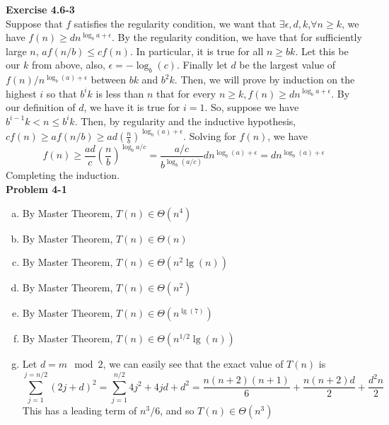 \documentclass{article}
\begin{document}
\noindent\textbf{Exercise 4.6-3}\\

Suppose that $f$ satisfies the regularity condition, we want that $\exists \epsilon, d,k$,$\forall n\ge k$, we have $f(n) \ge d n^{\log_b a +\epsilon}$. By the regularity condition, we have that for sufficiently large $n$, $af(n/b) \le cf(n)$. In particular, it is true for all $n\ge bk$. Let this be our $k$ from above, also, $\epsilon= -\log_b(c)$. Finally let $d$ be the largest value of $f(n)/n^{\log_b(a)+\epsilon}$ between $bk$ and $b^2k$. Then, we will prove by induction on the highest $i$ so that $b^i k$ is less than $n$ that for every $n\ge k, f(n) \ge d n^{\log_b a +\epsilon}$. By our definition of $d$, we have it is true for $i= 1$. So, suppose we have $b^{i-1}k < n \le b^i k$. Then, by regularity and the inductive hypothesis,  $cf(n) \ge a f(n/b) \ge ad \left(\frac{n}{b}\right)^{\log_b(a) +\epsilon}$. Solving for $f(n)$, we have
\[
f(n) \ge \frac{ad}{c} \left(\frac{n}{b}\right)^{\log_b{a/c}} = \frac{a/c}{b^{\log_b(a/c)}} d n^{\log_b(a) + \epsilon} =  d n^{\log_b(a) + \epsilon}
\]
Completing the induction. \\



\noindent\textbf{Problem 4-1}\\

\begin{enumerate}[a.]
\item
By Master Theorem, $T(n) \in \Theta(n^4)$

\item
By Master Theorem, $T(n) \in \Theta(n)$

\item
By Master Theorem, $T(n) \in \Theta(n^2\lg(n))$

\item
By Master Theorem, $T(n) \in \Theta(n^2)$

\item
By Master Theorem, $T(n) \in \Theta(n^{\lg(7)})$

\item
By Master Theorem, $T(n) \in \Theta(n^{1/2}\lg(n))$

\item
Let $d = m\mod 2$, we can easily see that the exact value of $T(n)$ is
\[
\sum_{j=1}^{j=n/2} (2j+d)^2 = \sum_{j=1}^{n/2}4j^2 + 4jd + d^2 = \frac{n(n+2)(n+1)}{6} + \frac{n(n+2)d}{2} + \frac{d^2n}{2}
\]
This has a leading term of $n^3/6$, and so $T(n) \in \Theta(n^3)$

\end{enumerate}
\end{document}
